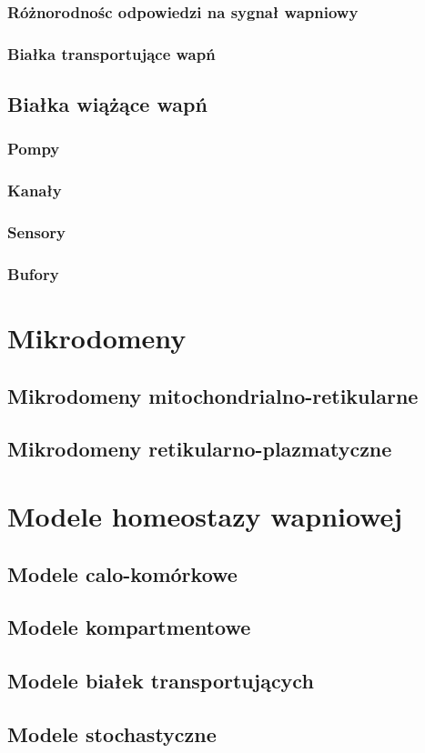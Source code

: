 	\subsubsection{Różnorodnośc odpowiedzi na sygnał wapniowy}
	\subsubsection{Białka transportujące wapń}

\subsection{Białka wiążące wapń}

	\subsubsection{Pompy}
	\subsubsection{Kanały}
	\subsubsection{Sensory}
	\subsubsection{Bufory}


\section{Mikrodomeny}

	\subsection{Mikrodomeny mitochondrialno-retikularne}
	\subsection{Mikrodomeny retikularno-plazmatyczne}

\section{Modele homeostazy wapniowej}

\subsection{Modele calo-komórkowe}

\subsection{Modele kompartmentowe}

\subsection{Modele białek transportujących}

\subsection{Modele stochastyczne}